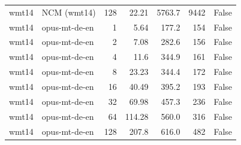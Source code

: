 \begin{table}[t]
\begin{tabular}{llrrrrr}
wmt14 & NCM (wmt14) & 128 & 22.21 & 5763.7 & 9442 & False \\
wmt14 & opus-mt-de-en & 1 & 5.64 & 177.2 & 154 & False \\
wmt14 & opus-mt-de-en & 2 & 7.08 & 282.6 & 156 & False \\
wmt14 & opus-mt-de-en & 4 & 11.6 & 344.9 & 161 & False \\
wmt14 & opus-mt-de-en & 8 & 23.23 & 344.4 & 172 & False \\
wmt14 & opus-mt-de-en & 16 & 40.49 & 395.2 & 193 & False \\
wmt14 & opus-mt-de-en & 32 & 69.98 & 457.3 & 236 & False \\
wmt14 & opus-mt-de-en & 64 & 114.28 & 560.0 & 316 & False \\
wmt14 & opus-mt-de-en & 128 & 207.8 & 616.0 & 482 & False \\
\bottomrule
\end{tabular}
\end{table}
